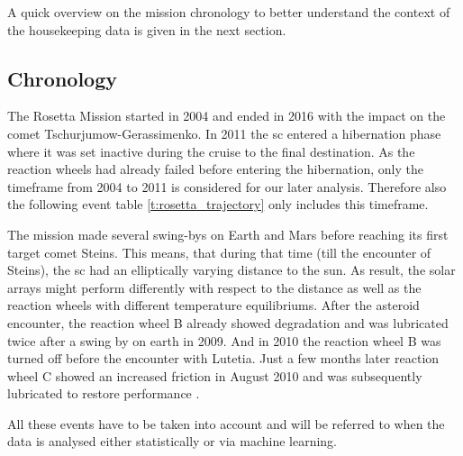 A quick overview on the mission chronology to better understand the context of the housekeeping data is given in the next section.

\subsection{Chronology}
The Rosetta Mission started in 2004 and ended in 2016 with the impact on the comet Tschurjumow-Gerassimenko. In 2011 the \ac{sc} entered a hibernation phase where it was set inactive during the cruise to the final destination. As the reaction wheels had already failed before entering the hibernation, only the timeframe from 2004 to 2011 is considered for our later analysis. Therefore also the following event table \ref{t:rosetta_trajectory} only includes this timeframe.

The mission made several swing-bys on Earth and Mars before reaching its first target comet Steins. This means, that during that time (till the encounter of Steins), the \ac{sc} had an elliptically varying distance to the sun. As result, the solar arrays might perform differently with respect to the distance as well as the reaction wheels with different temperature equilibriums. After the asteroid encounter, the reaction wheel B already showed degradation and was lubricated twice after a swing by on earth in 2009. And in 2010 the reaction wheel B was turned off before the encounter with Lutetia. Just a few months later reaction wheel C showed an increased friction in August 2010 and was subsequently lubricated to restore performance \cite{rosetta-maintenance}.

All these events have to be taken into account and will be referred to when the data is analysed either statistically or via machine learning.

